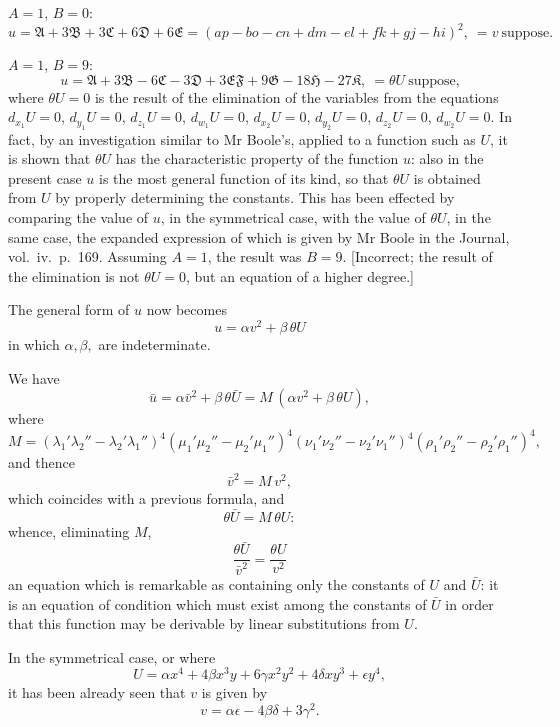 \documentclass[11pt]{article}
\newcommand{\fA}{\mathfrak{A}}
\newcommand{\fB}{\mathfrak{B}}
\newcommand{\fC}{\mathfrak{C}}
\newcommand{\fD}{\mathfrak{D}}
\newcommand{\fE}{\mathfrak{E}}
\newcommand{\fF}{\mathfrak{F}}
\newcommand{\fG}{\mathfrak{G}}
\newcommand{\fH}{\mathfrak{H}}
\newcommand{\fK}{\mathfrak{K}}
\begin{document}
\noindent $A=1$, $B=0$:
\[
u = \fA + 3\fB + 3\fC + 6\fD + 6\fE = (ap - bo - cn + dm - el + fk + gj - hi)^2,\ =v\ \text{suppose}.
\]

\noindent $A=1$, $B=9$:
\[
u = \fA + 3\fB - 6\fC - 3\fD + 3\fE\fF + 9\fG - 18\fH - 27\fK,\ =\theta U\ \text{suppose,}
\]
where $\theta U=0$ is the result of the elimination of the variables from the equations
$d_{x_1} U=0$, $d_{y_1} U=0$, $d_{z_1} U=0$, $d_{w_1} U=0$, $d_{x_2} U=0$, $d_{y_2} U=0$, $d_{z_2} U=0$, $d_{w_2} U=0$. In fact, by
an investigation similar to Mr Boole's, applied to a function such as $U$, it is shown
that $\theta U$ has the characteristic property of the function $u$: also in the present case
$u$ is the most general function of its kind, so that $\theta U$ is obtained from $U$ by
properly determining the constants. This has been effected by comparing the value of
$u$, in the symmetrical case, with the value of $\theta U$, in the same case, the expanded
expression of which is given by Mr Boole in the Journal, vol.~iv.~p.~169. Assuming
$A=1$, the result was $B=9$. [Incorrect; the result of the elimination is not $\theta U = 0$,
but an equation of a higher degree.]

The general form of $u$ now becomes
\[
u = \alpha v^2 + \beta\,\theta U
\]
in which $\alpha, \beta,$ are indeterminate.

We have
\[
\bar{u} = \alpha \bar{v}^2 + \beta\,\theta\bar{U} = M\,(\alpha v^2 + \beta\,\theta U),
\]
where
\[
M = (\lambda_1'\lambda_2'' - \lambda_2'\lambda_1'')^4(\mu_1'\mu_2'' - \mu_2'\mu_1'')^4(\nu_1'\nu_2'' - \nu_2'\nu_1'')^4(\rho_1'\rho_2'' - \rho_2'\rho_1'')^4,
\]
and thence
\[
\bar{v}^2 = M\,v^2,
\]
which coincides with a previous formula, and
\[
\theta\bar{U} = M\,\theta U:
\]
whence, eliminating $M$,
\[
\frac{\theta\bar{U}}{\bar{v}^2} = \frac{\theta U}{v^2}
\]
an equation which is remarkable as containing only the constants of $U$ and $\bar{U}$: it is
an equation of condition which must exist among the constants of $\bar{U}$ in order that
this function may be derivable by linear substitutions from $U$.

In the symmetrical case, or where
\[
U = \alpha x^4 + 4\beta x^3 y + 6\gamma x^2 y^2 + 4\delta x y^3 + \epsilon y^4,
\]
it has been already seen that $v$ is given by
\[
v = \alpha\epsilon - 4\beta\delta + 3\gamma^2.
\]
\end{document}
